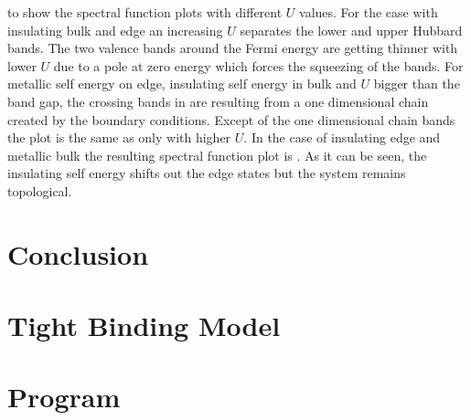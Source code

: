 \documentclass[a4paper,11pt]{report}
\begin{document}
 to  show the spectral function plots with
different $U$ values. For the case with insulating bulk and edge an increasing $U$ separates the lower and upper Hubbard
bands. The two valence bands around the Fermi energy are getting thinner with lower $U$ due to a pole at zero energy
which forces the squeezing of the bands. For metallic self energy on edge, insulating self energy in bulk and $U$ bigger 
than the band gap, the crossing bands in  are resulting from a one dimensional
chain created by the boundary conditions. Except of the one dimensional chain bands the plot is the same as 
 only with higher $U$. In the case of insulating edge and metallic bulk the resulting
spectral function plot is . As it can be seen, the insulating self energy shifts out 
the edge states but the system remains topological.


\chapter{Conclusion}

\appendix

\chapter{Tight Binding Model}\label{a:tb}
\chapter{Program}\label{a:program}
\end{document}
